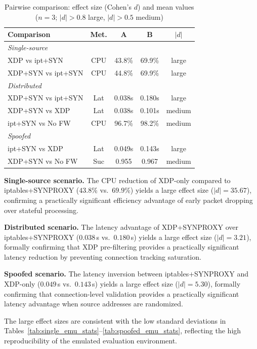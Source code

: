 \documentclass[conference]{IEEEtran}
\begin{document}
\begin{table}[h]
\centering
\caption{Pairwise comparison: effect size (Cohen's $d$) and mean values
($n=3$; $|d|{>}0.8$ large, $|d|{>}0.5$ medium)}
\label{tab:effectsize}
\footnotesize
\setlength{\tabcolsep}{3pt}
\begin{tabular}{|l|c|c|c|c|}
\hline
\textbf{Comparison} & \textbf{Met.} &
\textbf{A} & \textbf{B} & \textbf{$|d|$} \\
\hline
\multicolumn{5}{|l|}{\textit{Single-source}} \\
\hline
XDP vs ipt+SYN      & CPU & 43.8\% & 69.9\% & large \\
XDP+SYN vs ipt+SYN  & CPU & 44.8\% & 69.9\% & large \\
\hline
\multicolumn{5}{|l|}{\textit{Distributed}} \\
\hline
XDP+SYN vs ipt+SYN  & Lat & 0.038s & 0.180s & large \\
XDP+SYN vs XDP      & Lat & 0.038s & 0.101s & medium \\
ipt+SYN vs No FW    & CPU & 96.7\% & 98.2\% & medium \\
\hline
\multicolumn{5}{|l|}{\textit{Spoofed}} \\
\hline
ipt+SYN vs XDP      & Lat & 0.049s & 0.143s & large \\
XDP+SYN vs No FW    & Suc & 0.955  & 0.967  & medium \\
\hline
\end{tabular}
\end{table}

\textbf{Single-source scenario.}
The CPU reduction of XDP-only compared to iptables+SYNPROXY
($43.8$\% vs.\ $69.9$\%) yields a large effect size ($|d|=35.67$),
confirming a practically significant efficiency advantage of early packet
dropping over stateful processing.

\textbf{Distributed scenario.}
The latency advantage of XDP+SYNPROXY over iptables+SYNPROXY
($0.038$\,s vs.\ $0.180$\,s) yields a large effect size ($|d|=3.21$),
formally confirming that XDP pre-filtering provides a practically
significant latency reduction by preventing connection tracking saturation.

\textbf{Spoofed scenario.}
The latency inversion between iptables+SYNPROXY and XDP-only
($0.049$\,s vs.\ $0.143$\,s) yields a large effect size ($|d|=5.30$),
formally confirming that connection-level validation provides a practically
significant latency advantage when source addresses are randomized.

The large effect sizes are consistent with the low standard deviations in
Tables~\ref{tab:single_emu_stats}--\ref{tab:spoofed_emu_stats},
reflecting the high reproducibility of the emulated evaluation environment.
\end{document}
